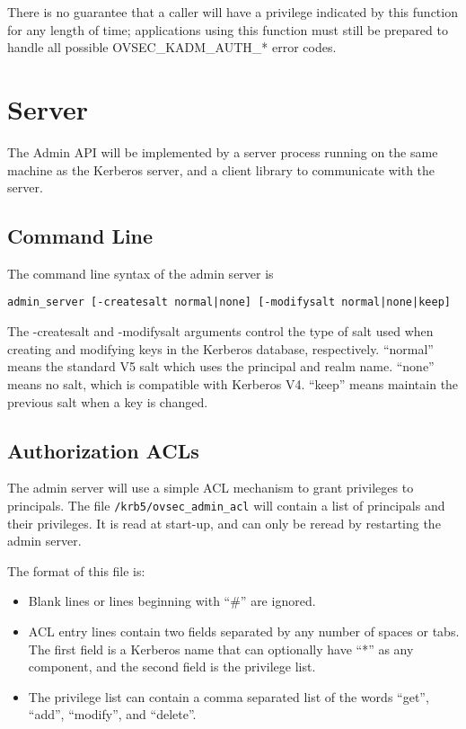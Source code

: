 There is no guarantee that a caller will have a privilege indicated by
this function for any length of time; applications using this function
must still be prepared to handle all possible OVSEC_KADM_AUTH_* error
codes.

\section{Server}

The Admin API will be implemented by a server process running on the
same machine as the Kerberos server, and a client library to
communicate with the server.

\subsection{Command Line}
\label{sec:commandline}

The command line syntax of the admin server is

\begin{verbatim}
admin_server [-createsalt normal|none] [-modifysalt normal|none|keep]
\end{verbatim}

The -createsalt and -modifysalt arguments control the type of salt
used when creating and modifying keys in the Kerberos database,
respectively.  ``normal'' means the standard V5 salt which uses the
principal and realm name.  ``none'' means no salt, which is compatible
with Kerberos V4.  ``keep'' means maintain the previous salt when a
key is changed.

\subsection{Authorization ACLs}
\label{sec:acls}

The admin server will use a simple ACL mechanism to grant privileges
to principals.  The file {\tt /krb5/ovsec_admin_acl} will contain a
list of principals and their privileges.  It is read at start-up, and
can only be reread by restarting the admin server.

The format of this file is:

\begin{itemize}
\item Blank lines or lines beginning with ``\#'' are ignored.

\item ACL entry lines contain two fields separated by any number of
spaces or tabs.  The first field is a Kerberos name that can
optionally have ``*'' as any component, and the second field is the
privilege list.

\item The privilege list can contain a comma separated list of the
words ``get'', ``add'', ``modify'', and ``delete''.
\end{itemize}

